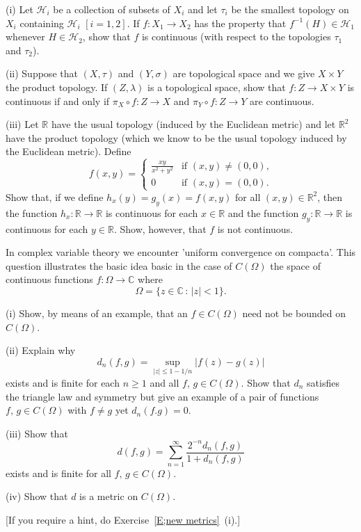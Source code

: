 \begin{exercise} (i) Let ${\mathcal H}_{i}$ be a collection of
subsets of $X_{i}$ and let $\tau_{i}$ be the smallest topology
on $X_{i}$ containing ${\mathcal H}_{i}$ $[i=1,2]$. If
$f:X_{1}\rightarrow X_{2}$ has the property that
$f^{-1}(H)\in {\mathcal H}_{1}$ whenever $H\in{\mathcal H}_{2}$,
show that $f$ is continuous
(with respect to the topologies $\tau_{1}$ and $\tau_{2}$).
                                                                                
(ii) Suppose that $(X,\tau)$ and $(Y,\sigma)$ are topological
space and we give $X\times Y$ the product topology.
If $(Z,\lambda)$ is a topological space, show that
$f:Z\rightarrow X\times Y$ is continuous if and only
if $\pi_{X}\circ f:Z\rightarrow X$ and
$\pi_{Y}\circ f:Z\rightarrow Y$ are continuous.

(iii) Let ${\mathbb R}$ have the usual topology (induced
by the Euclidean metric) and let ${\mathbb R}^{2}$
have the product topology (which we know to be
the usual topology induced by the Euclidean metric).
Define
\[
f(x,y)=
\begin{cases}
\frac{xy}{x^{2}+y^{2}}&\text{if $(x,y)\neq (0,0)$,}\\
0&\text{if $(x,y)=(0,0)$.}
\end{cases}
\]
Show that, if we define $h_{x}(y)=g_{y}(x)=f(x,y)$
for all $(x,y)\in{\mathbb R}^{2}$, then the function
$h_{x}:{\mathbb R}\rightarrow{\mathbb R}$ is continuous
for each $x\in{\mathbb R}$ and the function
$g_{y}:{\mathbb R}\rightarrow{\mathbb R}$ is continuous
for each $y\in{\mathbb R}$. Show, however, that $f$ is not
continuous.

\end{exercise}
\begin{exercise} In complex variable theory we encounter
'uniform convergence on compacta'. This question
illustrates the basic idea basic in the case of
$C(\Omega)$ the space of continuous
functions $f:\Omega\rightarrow{\mathbb C}$
where
\[\Omega=\{z\in{\mathbb C}\,:\,|z|<1\}.\]

(i) Show, by means of an example, that an $f\in C(\Omega)$
need not be bounded on $C(\Omega)$.

(ii) Explain why
\[d_{n}(f,g)=\sup_{|z|\leq 1-1/n}|f(z)-g(z)|\]
exists and is finite for each $n\geq 1$ and all
$f,\,g\in C(\Omega)$. Show that $d_{n}$ satisfies the
triangle law and symmetry but give an example of
a pair of functions
$f,\,g\in C(\Omega)$ with $f\neq g$ yet $d_{n}(f.g)=0$.
                                        
(iii) Show that
\[d(f,g)=\sum_{n=1}^{\infty}\frac{2^{-n}d_{n}(f,g)}{1+d_{n}(f,g)}\]
exists and is finite for all
$f,\,g\in C(\Omega)$.
                                                                    
(iv) Show that $d$ is a metric on $C(\Omega)$.

[If you require a hint, do Exercise~\ref{E;new metrics}~(i).]
\end{exercise}

